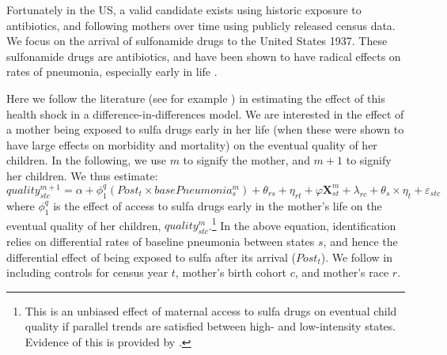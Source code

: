 \documentclass[subeqn]{article}
\begin{document}
\begin{spacing}{1.4}
Fortunately in the US, a valid candidate exists using historic exposure to
antibiotics, and following mothers over time using publicly released census
data.  We focus on the arrival of sulfonamide drugs to the United States 1937.
These sulfonamide drugs are antibiotics, and have been shown to have radical
effects on rates of pneumonia, especially early in life \citep{Jayachandranetal2010,
  BhalotraVenkataramani2014}.

Here we follow the literature (see for example \citet{BhalotraVenkataramani2014})
in estimating the effect of this health shock in a difference-in-differences model.
We are interested in the effect of a mother being exposed to sulfa drugs early
in her life (when these were shown to have large effects on morbidity and mortality)
on the eventual quality of her children.  In the following, we use $m$ to signify
the mother, and $m+1$ to signify her children.  We thus estimate:
\begin{equation}
  \label{TWINeqn:BV}
  quality^{m+1}_{stc} = \alpha + \phi^q_1 (Post_t\times basePneumonia^m_s) +\theta_{rs} +\eta_{rt}
  +\varphi\mathbf{X}^m_{st}+\lambda_{rc}+\theta_s\times\eta_t+\varepsilon_{stc}
\end{equation}
where $\phi^q_1$ is the effect of access to sulfa drugs early in the mother's life
on the eventual quality of her children, $quality^m_{stc}$.\footnote{This is an
  unbiased effect of maternal access to sulfa drugs on eventual child quality  if
  parallel trends are satisfied between high- and low-intensity states. Evidence of
  this is provided by \citet{BhalotraVenkataramani2014}.}  In the above equation,
identification relies on differential rates of baseline pneumonia between states
$s$, and hence the differential effect of being exposed to sulfa after its arrival
($Post_t$).  We follow \citet{BhalotraVenkataramani2014} in including controls
for census year $t$, mother's birth cohort $c$, and mother's race $r$.


\end{spacing}
\end{document}
